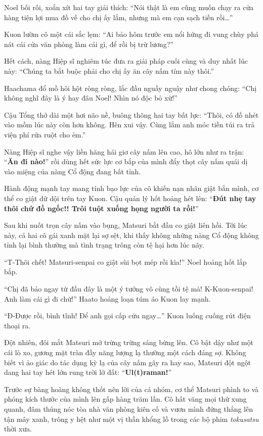 \documentclass[../main.tex]{subfiles}
\begin{document}
Noel bối rối, xoắn xít hai tay giải thích: ``Nói thật là em cũng muốn chạy ra cửa hàng tiện lợi mua đồ về cho chị ấy lắm, nhưng mà em cạn sạch tiền rồi\dots''

Kuon lườm cô một cái sắc lẹm: ``Ai bảo hôm trước em nổi hứng đi vung chùy phá nát cái cửa văn phòng làm cái gì, để rồi bị trừ lương?''

Hết cách, nàng Hiệp sĩ nghiêm túc đưa ra giải pháp cuối cùng và duy nhất lúc này: ``Chúng ta bắt buộc phải cho chị ấy ăn cây nấm tím này thôi.''

Haachama đổ mồ hôi hột ròng ròng, lắc đầu nguầy nguậy như chong chóng: ``Chị không nghĩ đây là ý hay đâu Noel! Nhìn nó độc bỏ xừ!''

Cậu Tổng thở dài một hơi não nề, buông thõng hai tay bất lực: ``Thôi, có đồ nhét vào mồm lúc này còn hơn không. Hên xui vậy. Cùng lắm anh móc tiền túi ra trả viện phí rửa ruột cho ẻm.''

Nàng Hiệp sĩ nghe vậy liền hăng hái giơ cây nấm lên cao, hô lớn như ra trận: ``\textbf{Ăn đi nào!}'' rồi dùng hết sức lực cơ bắp của mình đẩy thọt cây nấm quái dị vào miệng của nàng Cổ động đang bất tỉnh.


Hành động mạnh tay mang tính bạo lực của cô khiến nạn nhân giật bắn mình, cơ thể co giật dữ dội trên tay Kuon. Cậu quản lý hốt hoảng hét lên: ``\textbf{Đút nhẹ tay thôi chứ đồ ngốc!! Trôi tuột xuống họng người ta rồi!}''

Sau khi nuốt trọn cây nấm vào bụng, Matsuri bắt đầu co giật liên hồi. Tới lúc này, cả hai cô gái xanh mặt lại sợ sệt, khi thấy không những nàng Cổ động không tỉnh lại bình thường mà tình trạng trông còn tệ hại hơn lúc nãy.

``T-Thôi chết! Matsuri-senpai co giật sùi bọt mép rồi kìa!'' Noel hoảng hốt lắp bắp.

``Chị đã bảo ngay từ đầu đây là một ý tưởng vô cùng tồi tệ mà! K-Kuon-senpai! Anh làm cái gì đi chứ!'' Haato hoảng loạn túm áo Kuon lay mạnh.

``Đ-Được rồi, bình tĩnh! Để anh gọi cấp cứu ngay\dots'' Kuon luống cuống rút điện thoại ra.

Đột nhiên, đôi mắt Matsuri mở trừng trừng sáng bừng lên. Cô bật dậy như một cái lò xo, gương mặt tràn đầy năng lượng lạ thường một cách đáng sợ. Không biết vì ảo giác do tác dụng kỳ lạ của cây nấm gây ra hay sao, Matsuri đột ngột dang hai tay hét lớn rung trời lở đất: ``\textbf{Ul(t)raman!}''

Trước sự bàng hoàng không thốt nên lời của cả nhóm, cơ thể Matsuri phình to và phóng kích thước của mình lên gấp hàng trăm lần. Cô hất văng mọi thứ xung quanh, đâm thủng nóc tòa nhà văn phòng kiên cố và vươn mình đứng thẳng lên tận mây xanh, trông y hệt như một vị thần khổng lồ trong các bộ phim \textit{tokusatsu} thời xưa.
\end{document}
